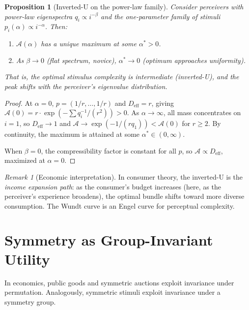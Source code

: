 \documentclass[journal]{IEEEtran}
\newtheorem{proposition}[theorem]{Proposition}
\theoremstyle{definition}
\theoremstyle{remark}
\newtheorem{remark}[theorem]{Remark}
\begin{document}
\begin{proposition}[Inverted-U on the power-law family]
\label{prop:berlyne_shape}
Consider perceivers with power-law eigenspectra $q_i \propto
i^{-\beta}$ and the one-parameter family of stimuli $p_i(\alpha)
\propto i^{-\alpha}$.  Then:
\begin{enumerate}
    \item[(a)] $\mathcal{A}(\alpha)$ has a unique maximum at some
    $\alpha^* > 0$.
    \item[(b)] As $\beta \to 0$ (flat spectrum, novice),
    $\alpha^* \to 0$ (optimum approaches uniformity).
\end{enumerate}
That is, the optimal stimulus complexity is intermediate (inverted-U),
and the peak shifts with the perceiver's eigenvalue distribution.
\end{proposition}

\begin{proof}
At $\alpha = 0$, $p = (1/r, \ldots, 1/r)$ and $D_{\mathrm{eff}} = r$,
giving $\mathcal{A}(0) = r \cdot \exp(-\sum q_i^{-1}/(r^2)) > 0$.
As $\alpha \to \infty$, all mass concentrates on $i = 1$, so
$D_{\mathrm{eff}} \to 1$ and $\mathcal{A} \to \exp(-1/(rq_1)) <
\mathcal{A}(0)$ for $r \geq 2$.  By continuity, the maximum is
attained at some $\alpha^* \in (0, \infty)$.

When $\beta = 0$, the compressibility factor is constant for all $p$,
so $\mathcal{A} \propto D_{\mathrm{eff}}$, maximized at $\alpha = 0$.
\end{proof}

\begin{remark}[Economic interpretation]
In consumer theory, the inverted-U is the \emph{income expansion
path}: as the consumer's budget increases (here, as the perceiver's
experience broadens), the optimal bundle shifts toward more diverse
consumption.  The Wundt curve is an Engel curve for perceptual
complexity.
\end{remark}


\section{Symmetry as Group-Invariant Utility}
\label{sec:symmetry}

In economics, public goods and symmetric auctions exploit
invariance under permutation.  Analogously, symmetric stimuli
exploit invariance under a symmetry group.
\end{document}
